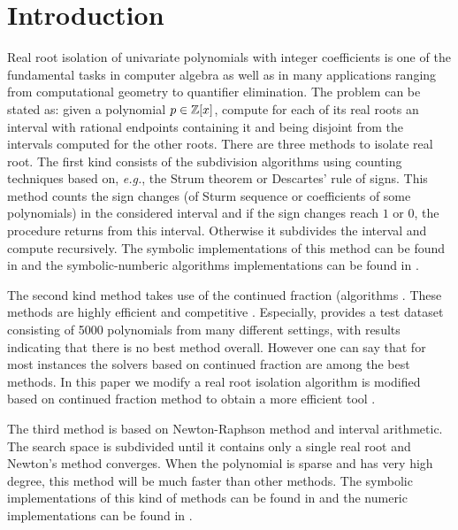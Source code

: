 
\section{Introduction }
\label{}
Real root isolation of univariate polynomials with integer coefficients is one of the fundamental tasks in computer algebra as well as in many applications ranging from computational geometry to quantifier elimination. The problem can be stated as: given a polynomial $p\in {\mathbb Z}[x]$, compute for each of its real roots an interval with rational endpoints containing it and being disjoint from the intervals
computed for the other roots.  There are three methods to isolate real root.  The first kind consists of the subdivision algorithms using counting techniques based  on, {\it e.g.}, the Strum theorem or
Descartes' rule of signs.  This  method counts the sign changes (of Sturm sequence or coefficients of some polynomials) in the considered interval and if the sign changes reach $1$ or $0$, the procedure returns from this interval.
Otherwise it subdivides the interval and compute recursively. The symbolic implementations of this method can be found in \cite{collin76,rou04,Tsigaridas2016} and the symbolic-numberic algorithms implementations can be found in \cite{rou04,eig05,eig08,meh11}. 

The second kind method takes use of the continued fraction (algorithms \cite{akr08,tsi08,sha08}. These methods are highly efficient and competitive \cite{rou04,akr05,hemmer09}. Especially,  \cite{hemmer09} provides a test dataset   consisting of 5000 polynomials from many
different settings,  with results indicating that there is no best method overall. However one can say that for most instances the solvers based on  continued fraction are among
the best methods. In this paper we modify a real root isolation algorithm is modified based on  continued fraction method to obtain a more efficient tool \froot.

The third method is based on Newton-Raphson method and interval arithmetic.
The search space is subdivided until it contains only a single real root and Newton's method converges. When the polynomial is sparse and has very high degree, this method will be much faster than other methods. The symbolic implementations of this kind of methods can be found in \cite{xia06,xia07} and the numeric implementations
can be found in \cite{kla93,rump99}.

